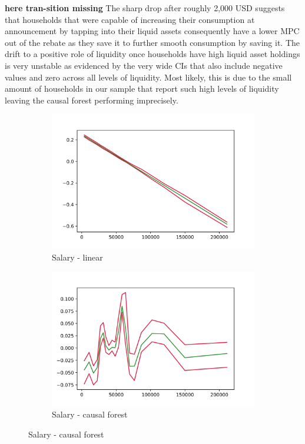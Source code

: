 \textbf{here tran-sition missing} The sharp drop after roughly 2,000 USD suggests that households that were capable of increasing their consumption at announcement by tapping into their liquid assets consequently have a lower MPC out of the rebate as they save it to further smooth consumption by saving it. The drift to a positive role of liquidity once households have high liquid asset holdings is very unstable as evidenced by the very wide CIs that also include negative values and zero across all levels of liquidity. Most likely, this is due to the small amount of households in our sample that report such high levels of liquidity leaving the causal forest performing imprecisely. \\
\begin{figure}[t]
    \centering
    \begin{subfigure}{0.5\textwidth}
        \includegraphics[width=\linewidth]{figures/ALE/chNDexp/spec3_linear_FSALARYM.png}
        \caption{Salary - linear}
    \end{subfigure}\hfill
    \begin{subfigure}{0.5\textwidth}
        \includegraphics[width=\linewidth]{figures/ALE/chNDexp/spec3_cf_FSALARYM.png}
        \caption{Salary - causal forest}
    \end{subfigure}\hfill


\end{figure}
